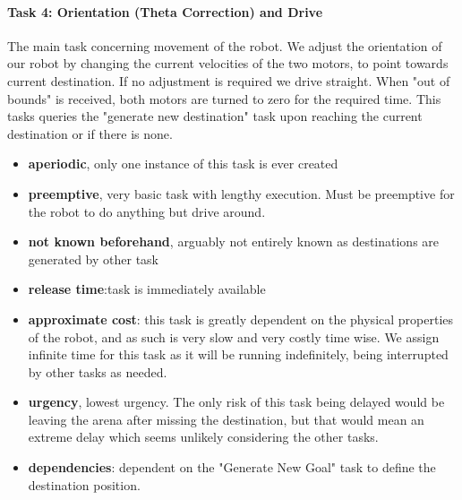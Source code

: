\documentclass[12pt]{article}
\begin{document}
\paragraph{Task 4: Orientation (Theta Correction) and Drive}
The main task concerning movement of the robot. We adjust the orientation of our robot by changing the current velocities of the two motors, to point towards current destination. If no adjustment is required we drive straight. When "out of bounds" is received, both motors are turned to zero for the required time. This tasks queries the "generate new destination" task upon reaching the current destination or if there is none.
\begin{itemize}
	\item \textbf{aperiodic}, only one instance of this task is ever created
	\item \textbf{preemptive}, very basic task with lengthy execution. Must be preemptive for the robot to do anything but drive around.
	\item \textbf{not known beforehand}, arguably not entirely known as destinations are generated by other task
	\item \textbf{release time}:task is immediately available
	\item \textbf{approximate cost}: this task is greatly dependent on the physical properties of the robot, and as such is very slow and very costly time wise. We assign infinite time for this task as it will be running indefinitely, being interrupted by other tasks as needed.
	\item \textbf{urgency}, lowest urgency. The only risk of this task being delayed would be leaving the arena after missing the destination, but that would mean an extreme delay which seems unlikely considering the other tasks.
	\item \textbf{dependencies}: dependent on the "Generate New Goal" task to define the destination position.
\end{itemize}
\end{document}

